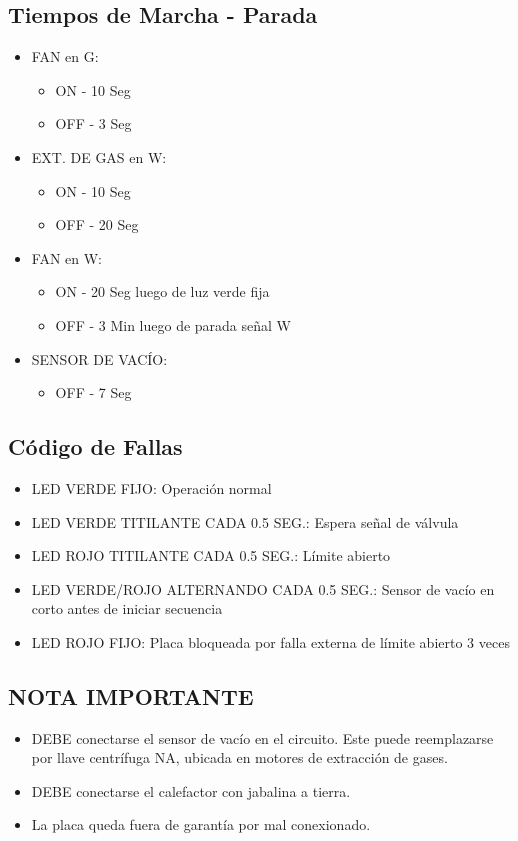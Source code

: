 \documentclass{article}
\begin{document}
\subsection*{Tiempos de Marcha - Parada}
\begin{itemize}
\item FAN en G:
\begin{itemize}
\item ON - 10 Seg
\item OFF - 3 Seg
\end{itemize}

\item EXT. DE GAS en W:
\begin{itemize}
\item ON - 10 Seg
\item OFF - 20 Seg
\end{itemize}

\item FAN en W:
\begin{itemize}
\item ON - 20 Seg luego de luz verde fija
\item OFF - 3 Min luego de parada señal W
\end{itemize}

\item SENSOR DE VACÍO:
\begin{itemize}
\item OFF - 7 Seg
\end{itemize}
\end{itemize}

\subsection*{Código de Fallas}
\begin{itemize}
\item LED VERDE FIJO: Operación normal
\item LED VERDE TITILANTE CADA 0.5 SEG.: Espera señal de válvula
\item LED ROJO TITILANTE CADA 0.5 SEG.: Límite abierto
\item LED VERDE/ROJO ALTERNANDO CADA 0.5 SEG.: Sensor de vacío en corto antes de iniciar secuencia
\item LED ROJO FIJO: Placa bloqueada por falla externa de límite abierto 3 veces
\end{itemize}

\subsection*{NOTA IMPORTANTE}
\begin{itemize}
\item DEBE conectarse el sensor de vacío en el circuito. Este puede reemplazarse por llave centrífuga NA, ubicada en motores de extracción de gases.
\item DEBE conectarse el calefactor con jabalina a tierra.
\item La placa queda fuera de garantía por mal conexionado.
\end{itemize}
\end{document}

